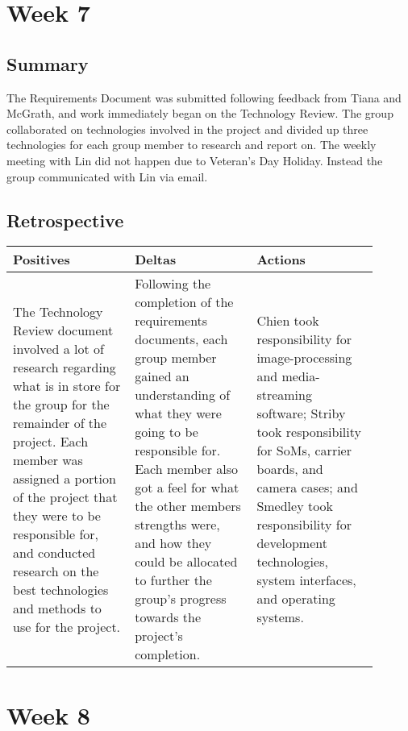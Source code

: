 \documentclass[letterpaper,10pt,serif,draftclsnofoot,onecolumn,compsoc,titlepage]{IEEEtran}
\begin{document}
\section{Week 7}

\subsection{Summary}

The Requirements Document was submitted following feedback from Tiana and McGrath, 
and work immediately began on the Technology Review. The group collaborated on 
technologies involved in the project and divided up three technologies for each 
group member to research and report on. The weekly meeting with Lin did not happen 
due to Veteran's Day Holiday. Instead the group communicated with Lin via email. \\

\subsection{Retrospective}

\begin{tabular}{|p{0.3\linewidth}|p{0.3\linewidth}|p{0.3\linewidth}|}
   \hline
   \textbf{Positives} & \textbf{Deltas} & \textbf{Actions}\\ 
   \hline
   The Technology Review document involved a lot of research regarding what is in 
   store for the group for the remainder of the project. Each member was assigned a portion of the project that they were to be responsible for, and conducted research on the best technologies and methods to use for the project. 
   & 
   Following the completion of the requirements documents, each group member gained an understanding of what they were going to be responsible for. Each member also got a feel for what the other members strengths were, and how they could be allocated to further the group's progress towards the project's completion.
   & 
   Chien took responsibility for image-processing and media-streaming software; Striby took responsibility for SoMs, carrier boards, and camera cases; and Smedley took responsibility for development technologies, system interfaces, and operating systems.
   \\
   \hline
\end{tabular}

\section{Week 8}
\end{document}
